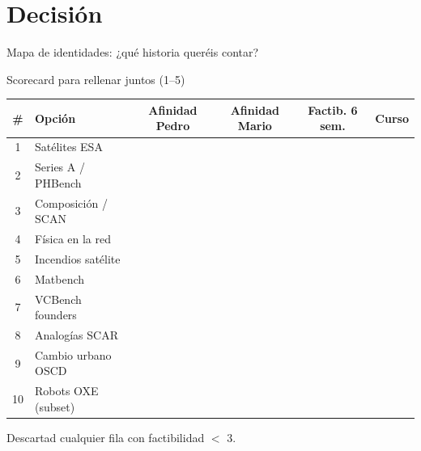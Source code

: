 \documentclass[aspectratio=169,10pt]{beamer}
\begin{document}
\section{Decisión}
\begin{frame}{Mapa de identidades: ¿qué historia queréis contar?}
  \begin{center}
  \end{center}
\end{frame}

\begin{frame}{Scorecard para rellenar juntos (1--5)}
  \tiny
  \renewcommand{\arraystretch}{1.25}
  \begin{tabular}{@{}clcccc@{}}
    \toprule
    \# & Opción & Afinidad Pedro & Afinidad Mario & Factib. 6 sem. & Curso \\
    \midrule
    1 & Satélites ESA & & & & \\
    2 & Series A / PHBench & & & & \\
    3 & Composición / SCAN & & & & \\
    4 & Física en la red & & & & \\
    5 & Incendios satélite & & & & \\
    6 & Matbench & & & & \\
    7 & VCBench founders & & & & \\
    8 & Analogías SCAR & & & & \\
    9 & Cambio urbano OSCD & & & & \\
    10 & Robots OXE (subset) & & & & \\
    \bottomrule
  \end{tabular}
  \vspace{0.45em}
  \normalsize Descartad cualquier fila con factibilidad $<$ 3.
\end{frame}
\end{document}
